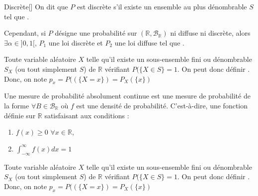 \documentclass[10pt, french]{article}
\begin{document}
\begin{multicols*}{2}
\begin{definitionGENERAL}{Discrète}[]
On dit que $P$ est discrète s'il existe un ensemble au plus dénombrable $S$ tel que .
\end{definitionGENERAL}

Cependant, si $P$ désigne une probabilité sur $(\mathbb{R}, \mathcal{B}_{\mathbb{R}})$ ni diffuse ni discrète, alors $\exists \alpha \in ]0, 1[$, $P_{1}$ une loi discrète et $P_{2}$ une loi diffuse tel que .

\bigskip

\begin{definitionNOHFILL}
Toute variable aléatoire $X$ telle qu'il existe un sous-ensemble fini ou dénombrable $S_{X}$ (ou tout simplement $S$) de $\mathbb{R}$ vérifiant $P(\{X \in S\} = 1$. On peut donc définir . Donc, on note $p_{x} = P((\{X = x\}) = P_{X}(\{x\})$
\end{definitionNOHFILL}

\begin{definitionNOHFILL}
Une mesure de probabilité absolument continue est une mesure de probabilité de la forme  $\forall B \in \mathcal{B}_{\mathbb{R}}$ où $f$ est une densité de probabilité. C'est-à-dire, une fonction définie sur $\mathbb{R}$ satisfaisant aux conditions : 
\begin{enumerate}[label = \circled{\arabic*}{trueblue}]
	\item	$f(x) \geq 0$ $\forall x \in \mathbb{R}$,
	\item	$\int_{-\infty}^{\infty} f(x)dx = 1$
\end{enumerate}

Toute variable aléatoire $X$ telle qu'il existe un sous-ensemble fini ou dénombrable $S_{X}$ (ou tout simplement $S$) de $\mathbb{R}$ vérifiant $P(\{X \in S\} = 1$. On peut donc définir . Donc, on note $p_{x} = P((\{X = x\}) = P_{X}(\{x\})$
\end{definitionNOHFILL}


\end{multicols*}
\end{document}
